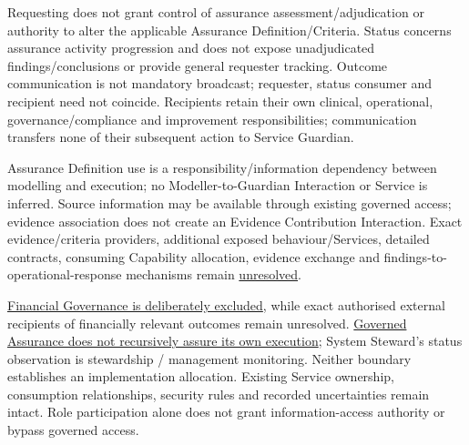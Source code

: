 Requesting does not grant control of assurance assessment/\allowbreak{}adjudication or authority to alter the applicable Assurance Definition/\allowbreak{}Criteria. Status concerns assurance activity progression and does not expose unadjudicated findings/\allowbreak{}conclusions or provide general requester tracking. Outcome communication is not mandatory broadcast; requester, status consumer and recipient need not coincide. Recipients retain their own clinical, operational, governance/\allowbreak{}compliance and improvement responsibilities; communication transfers none of their subsequent action to Service Guardian.

\label{rad:dependencies:111}

Assurance Definition use is a responsibility/\allowbreak{}information dependency between modelling and execution; no Modeller-to-Guardian Interaction or Service is inferred. Source information may be available through existing governed access; evidence association does not create an Evidence Contribution Interaction. Exact evidence/\allowbreak{}criteria providers, additional exposed behaviour/\allowbreak{}Services, detailed contracts, consuming Capability allocation, evidence exchange and findings-to-operational-response mechanisms remain \hyperref[rad:assurance:214]{unresolved}.

\label{rad:dependencies:113}

\href{https://github.com/fhirfactory/harmonia/blob/98410db60155198a75f74c79d98060070209faa1/docs/markdown/03-business-architecture/behaviours/health-service-assurance.md\#financial-governance-exclusion}{Financial Governance is deliberately excluded}, while exact authorised external recipients of financially relevant outcomes remain unresolved. \href{https://github.com/fhirfactory/harmonia/blob/98410db60155198a75f74c79d98060070209faa1/docs/markdown/03-business-architecture/behaviours/health-service-assurance.md\#assurance-non-recursion-boundary}{Governed Assurance does not recursively assure its own execution}; System Steward's status observation is stewardship /\allowbreak{} management monitoring. Neither boundary establishes an implementation allocation. Existing Service ownership, consumption relationships, security rules and recorded uncertainties remain intact. Role participation alone does not grant information-access authority or bypass governed access.

